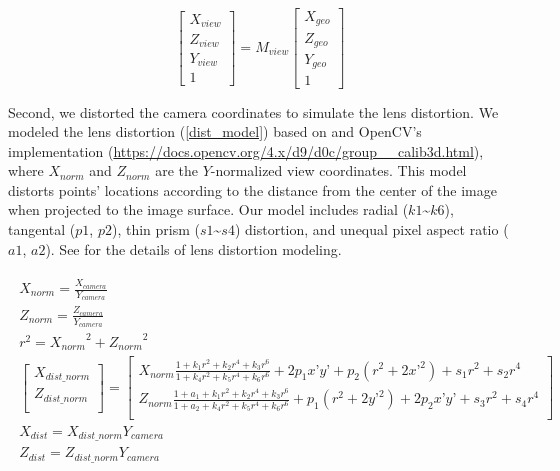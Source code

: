 \documentclass{article}
\begin{document}
\begin{equation}
\label{view_tf}
  \begin{bmatrix} 
    X_{view} \\ Z_{view} \\ Y_{view} \\ 1 
  \end{bmatrix}
  =
  M_{view}
  \begin{bmatrix} 
    X_{geo} \\ Z_{geo} \\ Y_{geo} \\ 1 
  \end{bmatrix}
\end{equation}

Second, we distorted the camera coordinates to simulate the lens distortion. We modeled the lens distortion (\ref{dist_model}) based on \cite{Weng1992CameraCalib} and OpenCV's implementation (\url{https://docs.opencv.org/4.x/d9/d0c/group__calib3d.html}), where \(X_{norm}\) and \(Z_{norm}\) are the \(Y\)-normalized view coordinates. This model distorts points' locations according to the distance from the center of the image when projected to the image surface. Our model includes radial (\(k1\)\textasciitilde{}\(k6\)), tangental (\(p1\), \(p2\)), thin prism (\(s1\)\textasciitilde{}\(s4\)) distortion, and unequal pixel aspect ratio (\(a1\), \(a2\)). See \cite{Weng1992CameraCalib} for the details of lens distortion modeling.

\begin{gather}
\label{dist_model}
  \begin{gathered}
  X_{norm} = \frac{X_{camera}}{Y_{camera}} \\
  Z_{norm} = \frac{Z_{camera}}{Y_{camera}} \\
  r^2 = {X_{norm}}^2 + {Z_{norm}}^2 \\
  \begin{bmatrix}
    X_{dist\_norm} \\ 
    Z_{dist\_norm} \\
  \end{bmatrix} 
  = 
  \begin{bmatrix} 
    X_{norm} \frac{1 + k_1 r^2 + k_2 r^4 + k_3 r^6}{1 + k_4 r^2 + k_5 r^4 + k_6 r^6} + 2 p_1 x’ y’ + p_2(r^2 + 2 x’^2) + s_1 r^2 + s_2 r^4 \\ 
    Z_{norm} \frac{1 + a_1 + k_1 r^2 + k_2 r^4 + k_3 r^6}{1 + a_2 + k_4 r^2 + k_5 r^4 + k_6 r^6} + p_1 (r^2 + 2 y’^2) + 2 p_2 x’ y’ + s_3 r^2 + s_4 r^4 \\    \end{bmatrix} \\
  X_{dist} = X_{dist\_norm} Y_{camera} \\
  Z_{dist} = Z_{dist\_norm} Y_{camera} \\
  \end{gathered}
\end{gather}
\end{document}
